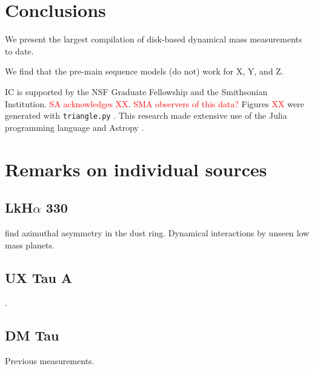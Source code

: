 \documentclass[twocolumn]{aastex6}
\newcommand{\todo}[1]{ \textcolor{red}{#1}}
\begin{document}


\section{Conclusions}

We present the largest compilation of disk-based dynamical mass measurements to date.

We find that the pre-main sequence models (do not) work for X, Y, and Z.

\acknowledgments
IC is supported by the NSF Graduate Fellowship and the Smithsonian Institution. \todo{SA acknowledges XX}. \todo{SMA observers of this data?}  Figures \todo{XX} were generated with \texttt{triangle.py} \citep{foreman-mackey14}. This research made extensive use of the Julia programming language \citep{julia12} and Astropy \citep{astropy13}.




\appendix

\section{Remarks on individual sources}

\subsection{LkH$\alpha$ 330}
\citet{isella13} find azimuthal asymmetry in the dust ring. Dynamical interactions by unseen low mass planets.


\subsection{UX Tau A}

\citep{espaillat07}.

\subsection{DM Tau}
Previous measurements.
\end{document}
